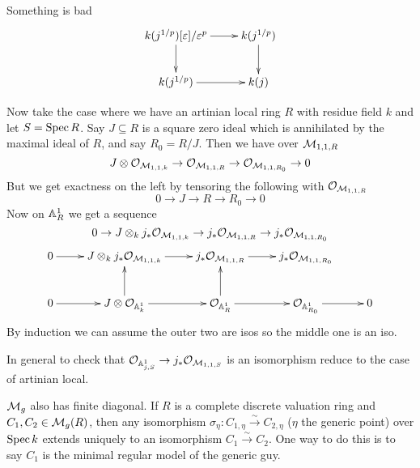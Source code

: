 \begin{example}
  Something is bad
  \[\xymatrix{
    k(j^{1/p})[\e]/\e^p \ar[r]\ar[d] & k(j^{1/p})\ar[d]\\
    k(j^{1/p})\ar[r] & k(j)
  }\]

  Now take the case where we have an artinian local ring $R$ with
residue field $k$ and let $S=\spec R$. Say $J\subseteq R$ is a square
zero ideal which is annihilated by the maximal ideal of $R$, and say
$R_0=R/J$. Then we have over $\M_{1,1,R}$
  \[
    J\otimes \O_{\M_{1,1,k}}\to \O_{\M_{1,1,R}}\to
\O_{\M_{1,1,R_0}}\to 0
  \]
  But we get exactness on the left by tensoring the following with
$\O_{\M_{1,1,R}}$
  \[
   0\to J\to R\to R_0\to 0
  \]
  Now on $\AA^1_R$ we get a sequence
  \[
   0\to J\otimes_k j_*\O_{\M_{1,1,k}}\to j_*\O_{\M_{1,1,R}} \to
j_*\O_{\M_{1,1,R_0}}
  \]
  \[\xymatrix{
    0\ar[r] & J\otimes_k j_*\O_{\M_{1,1,k}}\ar[r] &
j_*\O_{\M_{1,1,R}} \ar[r] & j_*\O_{\M_{1,1,R_0}} \\
    0\ar[r] & J\otimes \O_{\AA^1_k} \ar[u]\ar[r] & \O_{\AA^1_R}
\ar[u]\ar[r] & \O_{\AA^1_{R_0}} \ar[r] & 0
  }\]
  By induction we can assume the outer two are isos so the middle one
is an iso.

  In general to check that $\O_{\AA^1_{j,S}}\to j_*\O_{\M_{1,1,S}}$
is an isomorphism reduce to the case of artinian local.



\end{example}
$\M_{g}$ also has finite diagonal. If $R$ is a complete discrete
valuation ring and $C_1,C_2\in \M_g(R)$, then any isomorphism
$\sigma_\eta:C_{1,\eta}\xrightarrow\sim C_{2,\eta}$ ($\eta$ the
generic point) over $\spec k$ extends uniquely to an isomorphism
$C_1\xrightarrow\sim C_2$. One way to do this is to say $C_1$ is the
minimal regular model of the generic guy.

